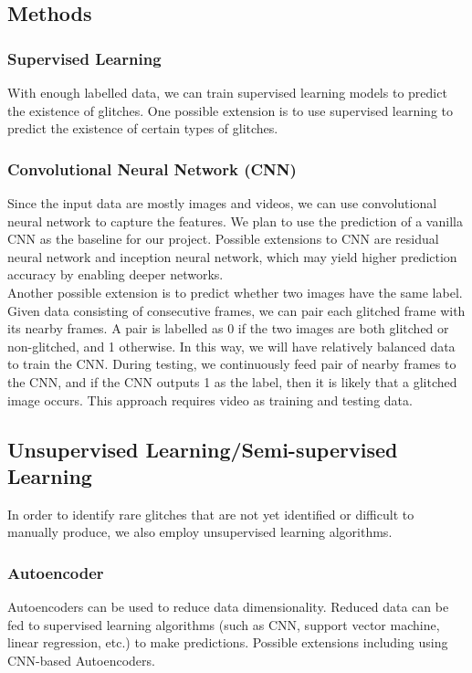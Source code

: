 \documentclass[12pt]{article}
\begin{document}
\subsection{Methods}
\subsubsection{Supervised Learning}
With enough labelled data, we can train supervised learning models to predict the existence of glitches. One possible extension is to use supervised learning to predict the existence of certain types of glitches.

\subsubsection{Convolutional Neural Network (CNN)}
Since the input data are mostly images and videos, we can use convolutional neural network to capture the features. We plan to use the prediction of a vanilla CNN as the baseline for our project. Possible extensions to CNN are residual neural network and inception neural network, which may yield higher prediction accuracy by enabling deeper networks.\\

\noindent Another possible extension is to predict whether two images have the same label. Given data consisting of consecutive frames, we can pair each glitched frame with its nearby frames. A pair is labelled as 0 if the two images are both glitched or non-glitched, and 1 otherwise. In this way, we will have relatively balanced data to train the CNN. During testing, we continuously feed pair of nearby frames to the CNN, and if the CNN outputs 1 as the label, then it is likely that a glitched image occurs. This approach requires video as training and testing data.

\subsection{Unsupervised Learning/Semi-supervised Learning}
In order to identify rare glitches that are not yet identified or difficult to manually produce, we also employ unsupervised learning algorithms.

\subsubsection{Autoencoder}

Autoencoders can be used to reduce data dimensionality. Reduced data can be fed to supervised learning algorithms (such as CNN, support vector machine, linear regression, etc.) to make predictions. Possible extensions including using CNN-based Autoencoders.\\
\end{document}
